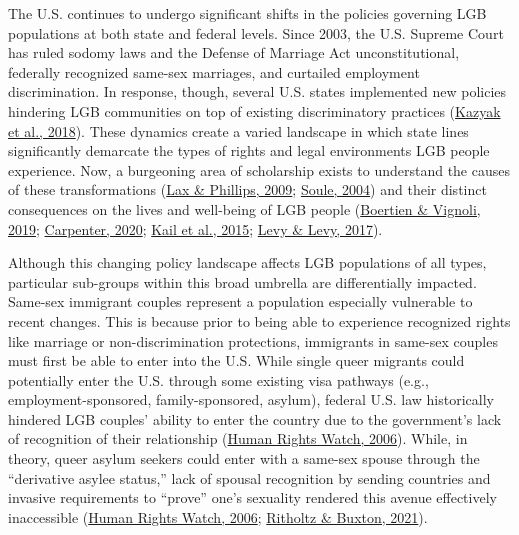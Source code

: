 \documentclass[
  12pt,
]{article}
\begin{document}
The U.S. continues to undergo significant shifts in the policies governing LGB populations at both state and federal levels. Since 2003, the U.S. Supreme Court has ruled sodomy laws and the Defense of Marriage Act unconstitutional, federally recognized same-sex marriages, and curtailed employment discrimination. In response, though, several U.S. states implemented new policies hindering LGB communities on top of existing discriminatory practices (\protect\hyperlink{ref-kazyak_2018}{Kazyak et al., 2018}). These dynamics create a varied landscape in which state lines significantly demarcate the types of rights and legal environments LGB people experience. Now, a burgeoning area of scholarship exists to understand the causes of these transformations (\protect\hyperlink{ref-lax_2009}{Lax \& Phillips, 2009}; \protect\hyperlink{ref-soule_2004}{Soule, 2004}) and their distinct consequences on the lives and well-being of LGB people (\protect\hyperlink{ref-boertien_2019}{Boertien \& Vignoli, 2019}; \protect\hyperlink{ref-carpenter_2020}{Carpenter, 2020}; \protect\hyperlink{ref-kail_2015}{Kail et al., 2015}; \protect\hyperlink{ref-levy_2017}{Levy \& Levy, 2017}).

Although this changing policy landscape affects LGB populations of all types, particular sub-groups within this broad umbrella are differentially impacted. Same-sex immigrant couples represent a population especially vulnerable to recent changes. This is because prior to being able to experience recognized rights like marriage or non-discrimination protections, immigrants in same-sex couples must first be able to enter into the U.S. While single queer migrants could potentially enter the U.S. through some existing visa pathways (e.g., employment-sponsored, family-sponsored, asylum), federal U.S. law historically hindered LGB couples' ability to enter the country due to the government's lack of recognition of their relationship (\protect\hyperlink{ref-humanrightswatch_2006}{Human Rights Watch, 2006}). While, in theory, queer asylum seekers could enter with a same-sex spouse through the ``derivative asylee status,'' lack of spousal recognition by sending countries and invasive requirements to ``prove'' one's sexuality rendered this avenue effectively inaccessible (\protect\hyperlink{ref-humanrightswatch_2006}{Human Rights Watch, 2006}; \protect\hyperlink{ref-ritholtz_2021_queer}{Ritholtz \& Buxton, 2021}).
\end{document}
